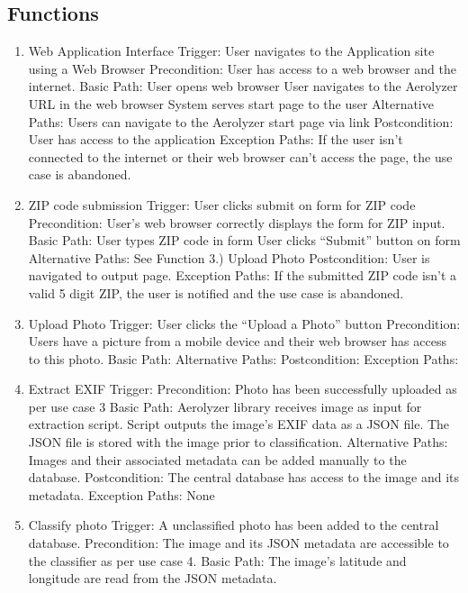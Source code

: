 \documentclass[journal,10pt,draftclsnofoot,onecolumn]{IEEEtran}
\begin{document}
\begin{singlespace}
\subsection{Functions}
\begin{enumerate}
\item Web Application Interface
Trigger: User navigates to the Application site using a Web Browser
Precondition: User has access to a web browser and the internet.
Basic Path:
User opens web browser
User navigates to the Aerolyzer URL in the web browser
System serves start page to the user
Alternative Paths: Users can navigate to the Aerolyzer start page via link
Postcondition: User has access to the application
Exception Paths: If the user isn't connected to the internet or their web browser can't access the page, the use case is abandoned.
\\
\item ZIP code submission
Trigger: User clicks submit on form for ZIP code
Precondition: User's web browser correctly displays the form for ZIP input.
Basic Path:
User types ZIP code in form
User clicks “Submit” button on form
Alternative Paths: See Function 3.) Upload Photo
Postcondition: User is navigated to output page.
Exception Paths: If the submitted ZIP code isn't a valid 5 digit ZIP, the user is notified and the use case is abandoned.
\\
\item Upload Photo
Trigger: User clicks the “Upload a Photo” button
Precondition: Users have a picture from a mobile device and their web browser has access to this photo.
Basic Path:
Alternative Paths:
Postcondition:
Exception Paths: 
\\
\item Extract EXIF
Trigger:
Precondition: Photo has been successfully uploaded as per use case 3
Basic Path: 
Aerolyzer library receives image as input for extraction script.
Script outputs the image's EXIF data as a JSON file.
The JSON file is stored with the image prior to classification.
Alternative Paths: Images and their associated metadata can be added manually to the database.
Postcondition: The central database has access to the image and its metadata.
Exception Paths: None
\\
\item Classify photo
Trigger: A unclassified photo has been added to the central database.
Precondition: The image and its JSON metadata are accessible to the classifier as per use case 4.
Basic Path:
	The image's latitude and longitude are read from the JSON metadata.

\end{enumerate}
\end{singlespace}
\end{document}
